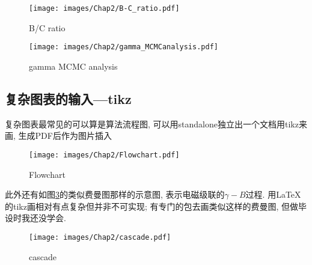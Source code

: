 \begin{figure}[th]
\parbox[t]{0.5\textwidth}{
\texttt{[image: images/Chap2/B-C\_ratio.pdf]}
\caption{B/C ratio}
\label{B-C_ratio}
}
\parbox[t]{0.5\textwidth}{
\texttt{[image: images/Chap2/gamma\_MCMCanalysis.pdf]}
\caption{gamma MCMC analysis}
\label{fig:gamma_MCMCanalysis}
}
\end{figure}

\subsection{复杂图表的输入---tikz}
\label{sec:tikz}
复杂图表最常见的可以算是算法流程图, 可以用standalone独立出一个文档用tikz来画, 生成PDF后作为图片插入
\begin{figure}[ht]
\centering
\texttt{[image: images/Chap2/Flowchart.pdf]}
\caption{Flowchart}
\label{Flowchart}
\end{figure}

\noindent 此外还有如图\ref{cascade}的类似费曼图那样的示意图, 表示电磁级联的$\gamma-B$过程. 用\LaTeX 的tikz画相对有点复杂但并非不可实现; 有专门的包去画类似这样的费曼图, 但做毕设时我还没学会.
\begin{figure}[ht]
\centering
\texttt{[image: images/Chap2/cascade.pdf]}
\caption{cascade}
\label{cascade}
\end{figure}


